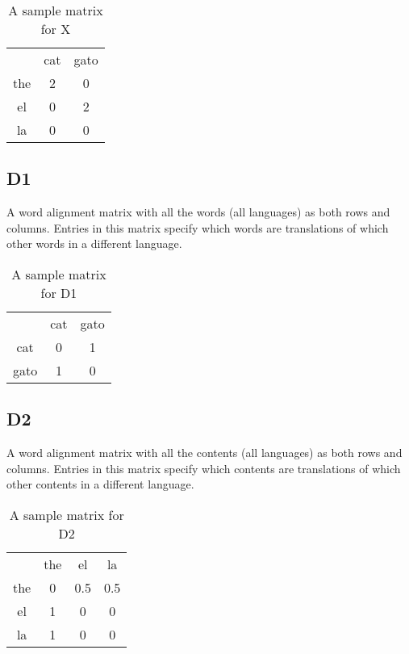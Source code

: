 \documentclass[11pt]{article}
\begin{document}
\begin{table}[h]  
\begin{center}
\begin{tabular}{ |c|c|c| } 
  \hline
  & cat & gato \\ 
  the & 2 & 0 \\ 
  el & 0 & 2 \\ 
  la & 0 & 0 \\ 
  \hline
\end{tabular}
\end{center}
\caption{\label{font-table} A sample matrix for X }
\end{table}

\subsection{D1}
A word alignment matrix with all the words (all languages) as both rows and columns.
Entries in this matrix specify which words are translations of which other words in a different language.


\begin{table}[h]
\begin{center}
\begin{tabular}{ |c|c|c| } 
  \hline
  & cat & gato \\ 
  cat & 0 & 1 \\ 
  gato & 1 & 0 \\ 
  \hline
\end{tabular}
\end{center}
\caption{\label{font-table} A sample matrix for D1 }
\end{table}

\subsection{D2}
A word alignment matrix with all the contents (all languages) as both rows and columns.
Entries in this matrix specify which contents are translations of which other contents in a different language.


\begin{table}[h]
\begin{center}
\begin{tabular}{ |c|c|c|c| } 
  \hline
  & the & el & la \\ 
  the & 0 & 0.5 & 0.5 \\ 
  el & 1 & 0 & 0 \\ 
  la & 1 & 0 & 0 \\ 
  \hline
\end{tabular}
\end{center}
\caption{\label{font-table} A sample matrix for D2 }
\end{table}
\end{document}
